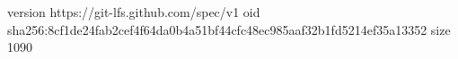version https://git-lfs.github.com/spec/v1
oid sha256:8cf1de24fab2cef4f64da0b4a51bf44cfc48ec985aaf32b1fd5214ef35a13352
size 1090

